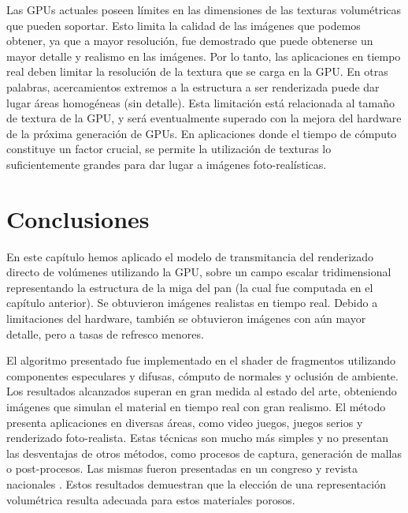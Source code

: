 Las GPUs actuales poseen límites en las dimensiones de las texturas volumétricas que pueden soportar.
Esto limita la calidad de las imágenes que podemos obtener, ya que a mayor resolución, fue demostrado que puede obtenerse un mayor detalle y realismo en las imágenes.
Por lo tanto, las aplicaciones en tiempo real deben limitar la resolución de la textura que se carga en la GPU.
En otras palabras, acercamientos extremos a la estructura a ser renderizada puede dar lugar áreas homogéneas (sin detalle).
Esta limitación está relacionada al tamaño de textura de la GPU, y será eventualmente superado con la mejora del hardware de la próxima generación de GPUs.
En aplicaciones donde el tiempo de cómputo constituye un factor crucial, se permite la utilización de texturas lo suficientemente grandes para dar lugar a imágenes foto-realísticas.

\section{Conclusiones}

En este capítulo hemos aplicado el modelo de transmitancia del renderizado directo de volúmenes utilizando la GPU, sobre un campo escalar tridimensional representando la estructura de la miga del pan (la cual fue computada en el capítulo anterior).
Se obtuvieron imágenes realistas en tiempo real.
Debido a limitaciones del hardware, también se obtuvieron imágenes con aún mayor detalle, pero a tasas de refresco menores.

El algoritmo presentado fue implementado en el shader de fragmentos utilizando componentes especulares y difusas, cómputo de normales y oclusión de ambiente.
Los resultados alcanzados superan en gran medida al estado del arte, obteniendo imágenes que simulan el material en tiempo real con gran realismo.
El método presenta aplicaciones en diversas áreas, como video juegos, juegos serios \cite{Susi2007} y renderizado foto-realista.
Estas técnicas son mucho más simples y no presentan las desventajas de otros métodos, como procesos de captura, generación de mallas o post-procesos.
Las mismas fueron presentadas en un congreso y revista nacionales \cite{Baravalle2014}.
Estos resultados demuestran que la elección de una representación volumétrica resulta adecuada para estos materiales porosos.



